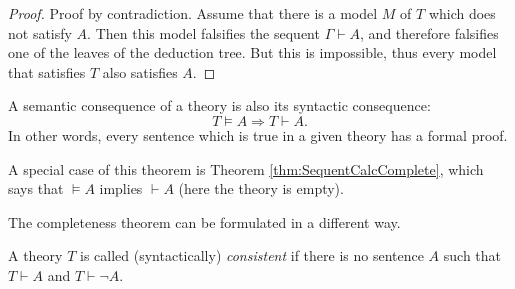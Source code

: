 \begin{page}
\setcounter{section}{3}
\setcounter{subsection}{2}
\setcounter{dfn}{17}
\label{portion:710}

\begin{proof}
Proof by contradiction.
Assume that there is a model $M$ of $T$ which does not satisfy $A$.
Then this model falsifies the sequent $\Gamma \vdash A$, and therefore falsifies one of the leaves of the deduction tree.
But this is impossible, thus every model that satisfies $T$ also satisfies $A$.
\end{proof}



\end{page}

\begin{page}
\setcounter{section}{3}
\setcounter{subsection}{2}
\setcounter{dfn}{18}
\label{portion:712}

\begin{thm}
\label{thm:Complete1}
A semantic consequence of a theory is also its syntactic consequence:
\[
T \vDash A \Rightarrow T \vdash A.
\]
In other words, every sentence which is true in a given theory has a formal proof.
\end{thm}

\end{page}

\begin{page}
\setcounter{section}{3}
\setcounter{subsection}{2}
\setcounter{dfn}{18}
\label{portion:713}


A special case of this theorem is Theorem \ref{thm:SequentCalcComplete}, which says that $\vDash A$ implies $\vdash A$
(here the theory is empty).


The completeness theorem can be formulated in a different way.


\end{page}

\begin{page}
\setcounter{section}{3}
\setcounter{subsection}{2}
\setcounter{dfn}{19}
\label{portion:715}

\begin{dfn}
A theory $T$ is called (syntactically) \emph{consistent} if there is no sentence $A$ such that $T \vdash A$ and $T \vdash \neg A$.
\end{dfn}

\end{page}

